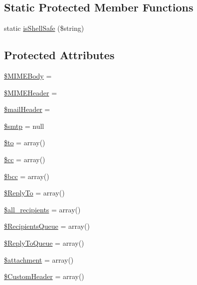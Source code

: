 \subsection*{Static Protected Member Functions}
\begin{DoxyCompactItemize}
\item 
static \hyperlink{class_p_h_p_mailer_aa9e20d8f3d4181d188ee1a4d43e4737e}{is\+Shell\+Safe} (\$string)
\end{DoxyCompactItemize}
\subsection*{Protected Attributes}
\begin{DoxyCompactItemize}
\item 
\hyperlink{class_p_h_p_mailer_a91bd736ba6ff85b61c24770f6bb09fda}{\$\+M\+I\+M\+E\+Body} = \textquotesingle{}\textquotesingle{}
\item 
\hyperlink{class_p_h_p_mailer_a272ba03cd59dc9aa3a0dc74ec74daaa1}{\$\+M\+I\+M\+E\+Header} = \textquotesingle{}\textquotesingle{}
\item 
\hyperlink{class_p_h_p_mailer_a3ad70a9d71fa41fd488f3148f24a2b42}{\$mail\+Header} = \textquotesingle{}\textquotesingle{}
\item 
\hyperlink{class_p_h_p_mailer_aad8f984db037346667c0ca16ed00af60}{\$smtp} = null
\item 
\hyperlink{class_p_h_p_mailer_ac19f839b525d6d99d063fe56bf2a6d3b}{\$to} = array()
\item 
\hyperlink{class_p_h_p_mailer_a9b0d06c40e3b730d537b8e1ab12ce238}{\$cc} = array()
\item 
\hyperlink{class_p_h_p_mailer_a5e11ecd89692e5b6bfa3702c7894e23d}{\$bcc} = array()
\item 
\hyperlink{class_p_h_p_mailer_a856ec7458d9fa38bb18e41d255d427ca}{\$\+Reply\+To} = array()
\item 
\hyperlink{class_p_h_p_mailer_a54b648f01a9df77a1434edd3a9e58462}{\$all\+\_\+recipients} = array()
\item 
\hyperlink{class_p_h_p_mailer_a51a46f673baf030a5777085861cc2e27}{\$\+Recipients\+Queue} = array()
\item 
\hyperlink{class_p_h_p_mailer_a2518fc6416330a3dad2d83beff2e3a8d}{\$\+Reply\+To\+Queue} = array()
\item 
\hyperlink{class_p_h_p_mailer_a4019bc6f2f49dc44acb1b4168505b19e}{\$attachment} = array()
\item 
\hyperlink{class_p_h_p_mailer_a14f2a8bd0d170d40810d432f58884f93}{\$\+Custom\+Header} = array()

\end{DoxyCompactItemize}
